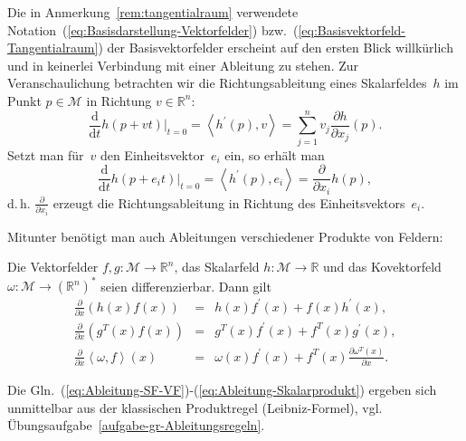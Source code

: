 \begin{remark}
\label{rem:Notation-Basis-Vektorfelder}Die
in Anmerkung~\ref{rem:tangentialraum} verwendete Notation~(\ref{eq:Basisdarstellung-Vektorfelder})
bzw.~(\ref{eq:Basisvektorfeld-Tangentialraum}) der Basisvektorfelder
erscheint auf den ersten Blick willkürlich und in keinerlei Verbindung
mit einer Ableitung zu stehen. Zur Veranschaulichung betrachten wir
die Richtungsableitung eines Skalarfeldes~$h$ im Punkt $p\in\mathcal{M}$
in Richtung $v\in{\mathbb{R}}^{n}$:
\[
\frac{{\mathrm{d}}}{{\mathrm{d}} t}\left.h(p+vt)\right|_{t=0}=\left\langle h^{\prime}(p),v\right\rangle =\sum_{j=1}^{n}v_{j}\frac{\partial h}{\partial x_{j}}(p).
\]
Setzt man für~$v$ den Einheitsvektor~$e_{i}$ ein, so erhält man
\[
\frac{{\mathrm{d}}}{{\mathrm{d}} t}\left.h(p+e_{i}t)\right|_{t=0}=\left\langle h^{\prime}(p),e_{i}\right\rangle =\frac{\partial}{\partial x_{i}}h(p),
\]
d.\,h. $\frac{\partial}{\partial x_{i}}$ erzeugt die Richtungsableitung
in Richtung des Einheitsvektors~$e_{i}$.
\end{remark}
Mitunter benötigt man auch Ableitungen verschiedener Produkte von
Feldern:
\begin{proposition}
\label{pro:Ableitungsregeln-Felder}Die Vektorfelder $f,g:\mathcal{M}{\to{\mathbb{R}}}^{n}$,
das Skalarfeld $h:\mathcal{M}\to{\mathbb{R}}$ und das Kovektorfeld $\omega:\mathcal{M}\to({\mathbb{R}}^{n})^{*}$
seien differenzierbar. Dann gilt \begin{subequations}\label{eq:Ableitungsregeln}
\begin{eqnarray}
\frac{\partial}{\partial x}\left(h(x)f(x)\right) & = & h(x)f^{\prime}(x)+f(x)h^{\prime}(x),\label{eq:Ableitung-SF-VF}\\
\frac{\partial}{\partial x}\left(g^{T}(x)f(x)\right) & = & g^{T}(x)f^{\prime}(x)+f^{T}(x)g^{\prime}(x),\label{eq:Ableitung-VF-VF}\\
\frac{\partial}{\partial x}\left\langle \omega,f\right\rangle (x) & = & \omega(x)f^{\prime}(x)+f^{T}(x)\frac{\partial\omega^{T}(x)}{\partial x}.\label{eq:Ableitung-Skalarprodukt}
\end{eqnarray}
\end{subequations}
\end{proposition}
Die Gln.~(\ref{eq:Ableitung-SF-VF})-(\ref{eq:Ableitung-Skalarprodukt})
ergeben sich unmittelbar aus der klassischen Produktregel (Leibniz-Formel),
vgl. Übungsaufgabe~\ref{aufgabe-gr-Ableitungsregeln}.

